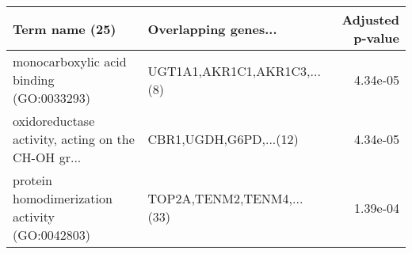 \begin{tabular}{llr}
\toprule
                                    Term name (25) &        Overlapping genes... &  Adjusted p-value \\
\midrule
          monocarboxylic acid binding (GO:0033293) & UGT1A1,AKR1C1,AKR1C3,...(8) &          4.34e-05 \\
oxidoreductase activity, acting on the CH-OH gr... &      CBR1,UGDH,G6PD,...(12) &          4.34e-05 \\
    protein homodimerization activity (GO:0042803) &   TOP2A,TENM2,TENM4,...(33) &          1.39e-04 \\
\bottomrule
\end{tabular}
